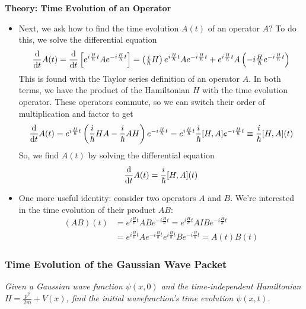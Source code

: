 \documentclass[11pt, a4paper]{article}
\newcommand{\tev}{e^{-i\frac{H}{\hbar}t}}  %
\newcommand{\tevp}{e^{i\frac{H}{\hbar}t}}  %
\begin{document}
\textbf{Theory: Time Evolution of an Operator}
\begin{itemize}
	\item Next, we ask how to find the time evolution $ A(t) $ of an operator $ A $? To do this, we solve the differential equation
	\begin{equation*}
		\dv{t}A(t) = \dv{t}\left[\tevp A \tev \right] = \left(\tfrac{i}{\hbar}H\right)\tevp A \tev + \tevp A\left(-i\tfrac{H}{\hbar}\tev\right)
	\end{equation*}
	This is found with the Taylor series definition of an operator $ A $. In both terms, we have the product of the Hamiltonian $ H $ with the time evolution operator. These operators commute, so we can switch their order of multiplication and factor to get
	\begin{equation*}
		\dv{t}A(t) = \tevp \left(\frac{i}{\hbar}HA - \frac{i}{\hbar}AH\right) \tev = \tevp \frac{i}{\hbar}[H, A]\tev \equiv \frac{i}{\hbar}[H, A](t)
	\end{equation*}
	So, we find $ A(t) $ by solving the differential equation
	\begin{equation*}
		\dv{t}A(t) = \frac{i}{\hbar}[H, A](t)
	\end{equation*}
	
	\item One more useful identity: consider two operators $ A $ and $ B $. We're interested in the time evolution of their product $ AB $: 
	\begin{align*}
		(AB)(t) &= \tevp AB \tev = \tevp A I B \tev\\
		&=\tevp A \tev \tevp B \tev = A(t)B(t)
	\end{align*}

\end{itemize}


\subsubsection{Time Evolution of the Gaussian Wave Packet}
\textit{Given a Gaussian wave function $ \psi(x, 0) $ and the time-independent Hamiltonian $ H = \frac{p^{2}}{2m} + V(x) $, find the initial wavefunction's time evolution $ \psi(x, t) $.}
\end{document}
